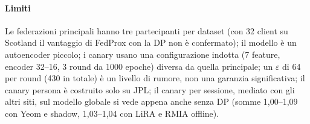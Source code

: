 \paragraph{Limiti}
Le federazioni principali hanno tre partecipanti per dataset (con 32 client su Scotland il
vantaggio di FedProx con la DP non è confermato); il modello è un autoencoder piccolo; i
canary usano una configurazione indotta (7 feature, encoder 32--16, 3 round da 1000 epoche)
diversa da quella principale; un $\varepsilon$ di 64 per round (430 in totale) è un livello di
rumore, non una garanzia significativa; il canary persona è costruito solo su JPL; il
canary per sessione, mediato con gli altri siti, sul modello globale si vede appena anche senza
DP (somme 1,00--1,09 con Yeom e shadow, 1,03--1,04 con LiRA e RMIA offline).
